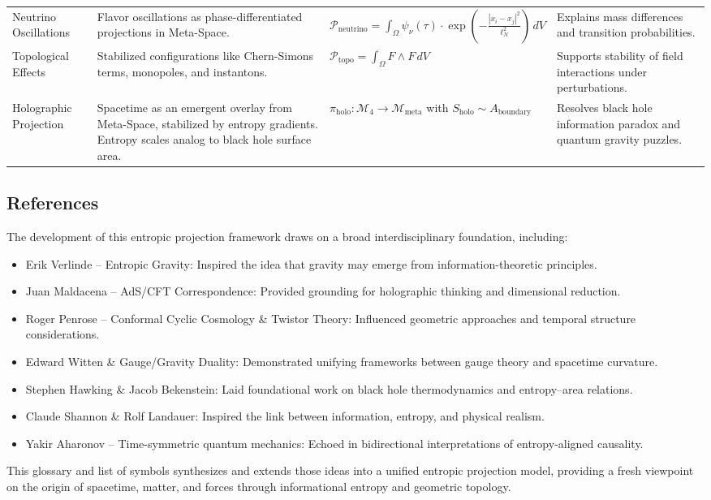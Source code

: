 \documentclass[10.5pt,a4paper]{article}
\begin{document}
{\begin{longtable}{p{2.5cm} p{4.75cm} p{5cm} p{4.25cm}}
Neutrino Oscillations & Flavor oscillations as phase-differentiated projections in Meta-Space. & \( \mathcal{P}_{\text{neutrino}} = \int_\Omega \psi_\nu(\tau) \cdot \exp\left(-\frac{|x_i - x_j|^2}{\ell_N^2}\right) \, dV \) & Explains mass differences and transition probabilities. \\

Topological Effects & Stabilized configurations like Chern-Simons terms, monopoles, and instantons. & \( \mathcal{P}_{\text{topo}} = \int_\Omega F \wedge F \, dV \) & Supports stability of field interactions under perturbations. \\

Holographic Projection & Spacetime as an emergent overlay from Meta-Space, stabilized by entropy gradients. Entropy scales analog to black hole surface area. & \( \pi_{\text{holo}}: \mathcal{M}_4 \rightarrow \mathcal{M}_{\text{meta}} \) with \( S_{\text{holo}} \sim A_{\text{boundary}} \) & Resolves black hole information paradox and quantum gravity puzzles. \\

\end{longtable}
}
\subsection{References}

The development of this entropic projection framework draws on a broad interdisciplinary foundation, including:

\begin{itemize}
    \item Erik Verlinde – Entropic Gravity: Inspired the idea that gravity may emerge from information-theoretic principles.
    \item Juan Maldacena – AdS/CFT Correspondence: Provided grounding for holographic thinking and dimensional reduction.
    \item Roger Penrose – Conformal Cyclic Cosmology \& Twistor Theory: Influenced geometric approaches and temporal structure considerations.
    \item Edward Witten \& Gauge/Gravity Duality: Demonstrated unifying frameworks between gauge theory and spacetime curvature.
    \item Stephen Hawking \& Jacob Bekenstein: Laid foundational work on black hole thermodynamics and entropy--area relations.
    \item Claude Shannon \& Rolf Landauer: Inspired the link between information, entropy, and physical realism.
    \item Yakir Aharonov – Time-symmetric quantum mechanics: Echoed in bidirectional interpretations of entropy-aligned causality.
\end{itemize}

This glossary and list of symbols synthesizes and extends those ideas into a unified entropic projection model, providing a fresh viewpoint on the origin of spacetime, matter, and forces through informational entropy and geometric topology.
\end{document}
